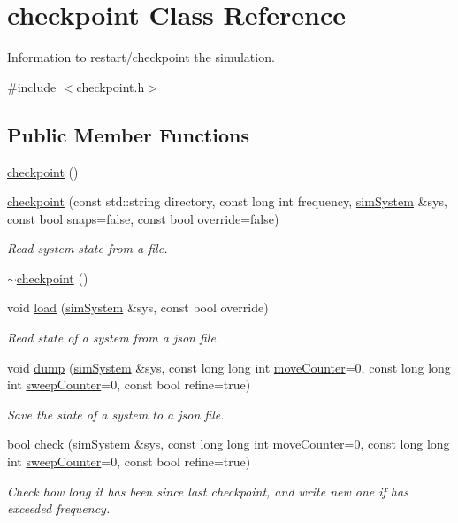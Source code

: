 \hypertarget{classcheckpoint}{\section{checkpoint Class Reference}
\label{classcheckpoint}
}


Information to restart/checkpoint the simulation.  




{\ttfamily \#include $<$checkpoint.\-h$>$}

\subsection*{Public Member Functions}
\begin{DoxyCompactItemize}
\item 
\hyperlink{classcheckpoint_a0c9fbc3decbdd8a0eedd43e4bef55583}{checkpoint} ()
\item 
\hyperlink{classcheckpoint_ac04bc1b2caf79f6071842919d5743024}{checkpoint} (const std\-::string directory, const long int frequency, \hyperlink{classsim_system}{sim\-System} \&sys, const bool snaps=false, const bool override=false)
\begin{DoxyCompactList}\small\item\em Read system state from a file. \end{DoxyCompactList}\item 
\hyperlink{classcheckpoint_a953aa90982db63755a071332c296ea68}{$\sim$checkpoint} ()
\item 
void \hyperlink{classcheckpoint_afe0ae7b3a2b83b5e321f09e9cb70a374}{load} (\hyperlink{classsim_system}{sim\-System} \&sys, const bool override)
\begin{DoxyCompactList}\small\item\em Read state of a system from a json file. \end{DoxyCompactList}\item 
void \hyperlink{classcheckpoint_a797b53961f8cf53bc78762144a514357}{dump} (\hyperlink{classsim_system}{sim\-System} \&sys, const long long int \hyperlink{classcheckpoint_a5ab49a355714da4874aba00eb03f701d}{move\-Counter}=0, const long long int \hyperlink{classcheckpoint_ad011ddbca1ea708321335b1b3ac67e07}{sweep\-Counter}=0, const bool refine=true)
\begin{DoxyCompactList}\small\item\em Save the state of a system to a json file. \end{DoxyCompactList}\item 
bool \hyperlink{classcheckpoint_ab2f76253fde665ee149c1380e78f5c2f}{check} (\hyperlink{classsim_system}{sim\-System} \&sys, const long long int \hyperlink{classcheckpoint_a5ab49a355714da4874aba00eb03f701d}{move\-Counter}=0, const long long int \hyperlink{classcheckpoint_ad011ddbca1ea708321335b1b3ac67e07}{sweep\-Counter}=0, const bool refine=true)
\begin{DoxyCompactList}\small\item\em Check how long it has been since last checkpoint, and write new one if has exceeded frequency. \end{DoxyCompactList}\end{DoxyCompactItemize}
